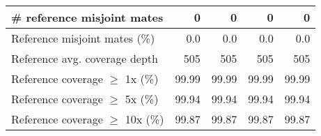 \documentclass[12pt,a4paper]{article}
\begin{document}
\begin{table}[ht]
\begin{center}
\begin{tabular}{|l*{4}{|r}|}
\# reference misjoint mates & 0 & 0 & 0 & 0 \\ \hline
Reference misjoint mates (\%) & 0.0 & 0.0 & 0.0 & 0.0 \\ \hline
Reference avg. coverage depth & 505 & 505 & 505 & 505 \\ \hline
Reference coverage $\geq$ 1x (\%) & 99.99 & 99.99 & 99.99 & 99.99 \\ \hline
Reference coverage $\geq$ 5x (\%) & 99.94 & 99.94 & 99.94 & 99.94 \\ \hline
Reference coverage $\geq$ 10x (\%) & 99.87 & 99.87 & 99.87 & 99.87 \\ \hline
\end{tabular}
\end{center}
\end{table}
\end{document}
